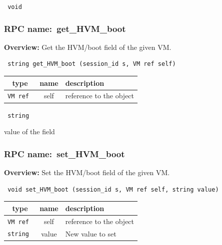 \vspace{0.3cm}

{\tt 
void
}



\vspace{0.3cm}
\vspace{0.3cm}
\vspace{0.3cm}
\subsubsection{RPC name:~get\_HVM\_boot}

{\bf Overview:} 
Get the HVM/boot field of the given VM.

\begin{verbatim} string get_HVM_boot (session_id s, VM ref self)\end{verbatim}



 
\vspace{0.3cm}
\begin{tabular}{|c|c|p{7cm}|}
 \hline
{\bf type} & {\bf name} & {\bf description} \\ \hline
{\tt VM ref } & self & reference to the object \\ \hline 

\end{tabular}

\vspace{0.3cm}

{\tt 
string
}


value of the field
\vspace{0.3cm}
\vspace{0.3cm}
\vspace{0.3cm}
\subsubsection{RPC name:~set\_HVM\_boot}

{\bf Overview:} 
Set the HVM/boot field of the given VM.

\begin{verbatim} void set_HVM_boot (session_id s, VM ref self, string value)\end{verbatim}



 
\vspace{0.3cm}
\begin{tabular}{|c|c|p{7cm}|}
 \hline
{\bf type} & {\bf name} & {\bf description} \\ \hline
{\tt VM ref } & self & reference to the object \\ \hline 

{\tt string } & value & New value to set \\ \hline 

\end{tabular}

